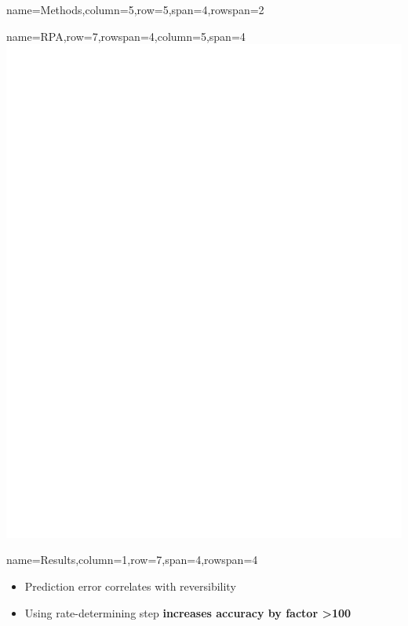 \documentclass[
	accentcolor=3c,
	boxstyle=colored %
	]{tudasciposter}
\begin{document}
\begin{tcbposter}[
	poster={
		columns=8,
		rows=12,
		spacing=1cm,
	},]
\begin{posterboxenv}[title=2. Methods]{name=Methods,column=5,row=5,span=4,rowspan=2}
\end{posterboxenv}

\begin{posterboxenv}{name=RPA,row=7,rowspan=4,column=5,span=4}
	\includegraphics[width=\linewidth]{abb/Fig_4_extended_fine_thick}
\end{posterboxenv}
\begin{posterboxenv}[title=3. Results]{name=Results,column=1,row=7,span=4,rowspan=4}
	\vspace{-1.6cm} %
	\begin{itemize}
		\item Prediction error correlates with reversibility
		\item Using rate-determining step \textbf{increases accuracy by factor >100}

\end{itemize}
\end{posterboxenv}
\end{tcbposter}
\end{document}
